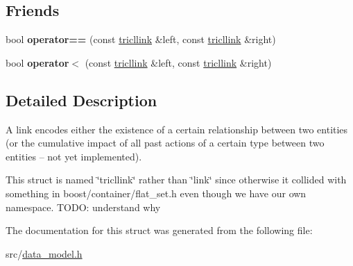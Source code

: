 \subsection*{Friends}
\begin{DoxyCompactItemize}
\item 
\mbox{\label{structtricl_1_1tricllink_a9e7da803472b5df141fcc160eb0810d9}} 
bool {\bfseries operator==} (const \hyperlink{structtricl_1_1tricllink}{tricllink} \&left, const \hyperlink{structtricl_1_1tricllink}{tricllink} \&right)
\item 
\mbox{\label{structtricl_1_1tricllink_a431ac5bcbab6098392f451d1144cda04}} 
bool {\bfseries operator$<$} (const \hyperlink{structtricl_1_1tricllink}{tricllink} \&left, const \hyperlink{structtricl_1_1tricllink}{tricllink} \&right)
\end{DoxyCompactItemize}


\subsection{Detailed Description}
A link encodes either the existence of a certain relationship between two entities (or the cumulative impact of all past actions of a certain type between two entities -- not yet implemented). 

This struct is named \char`\"{}tricllink\char`\"{} rather than \char`\"{}link\char`\"{} since otherwise it collided with something in boost/container/flat\+\_\+set.\+h even though we have our own namespace. T\+O\+DO\+: understand why 

The documentation for this struct was generated from the following file\+:\begin{DoxyCompactItemize}
\item 
src/\hyperlink{data__model_8h}{data\+\_\+model.\+h}\end{DoxyCompactItemize}
